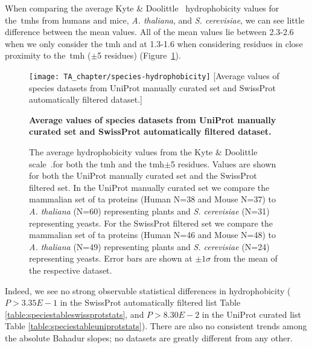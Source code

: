 When comparing the average Kyte \& Doolittle~\cite{Kyte1982} hydrophobicity values for the~\gls{tmh}s from humans and mice, \textit{A. thaliana}, and  \textit{S. cerevisiae}, we can see little difference between the mean values.
All of the mean values lie between 2.3-2.6 when we only consider the \gls{tmh} and at 1.3-1.6 when considering residues in close proximity to the~\gls{tmh} ($\pm$5 residues) (Figure~\ref{fig:average_species_hydrophobicity_ta}).

\begin{figure}[!ht]
\centering
\texttt{[image: TA\_chapter/species-hydrophobicity]}
[Average values of species datasets from UniProt manually curated set and SwissProt automatically filtered dataset.]
{\textbf{Average values of species datasets from UniProt manually curated set and SwissProt automatically filtered dataset.}

The average hydrophobicity values from the Kyte \& Doolittle scale~\cite{Kyte1982}.for both the \gls{tmh} and the \gls{tmh}$\pm$5 residues.
Values are shown for both the UniProt manually curated set and the SwissProt filtered set. In the UniProt manually curated set we compare the mammalian set of \gls{ta} proteins (Human N=38 and Mouse N=37) to \textit{A. thaliana} (N=60) representing plants and \textit{S. cerevisiae} (N=31) representing yeasts. For the SwissProt filtered set we compare the mammalian set of \gls{ta} proteins (Human N=46 and Mouse N=48) to \textit{A. thaliana} (N=49) representing plants  and  \textit{S. cerevisiae} (N=24) representing yeasts.
Error bars are shown at $\pm 1 \sigma$ from the mean of the respective dataset.
}

\label{fig:average_species_hydrophobicity_ta}
\end{figure}

Indeed, we see no strong observable statistical differences in hydrophobicity ($P>3.35E-1$ in the SwissProt automatically filtered list Table \ref{table:speciestableswissprotstats}, and $P>8.30E-2$ in the UniProt curated list Table \ref{table:speciestableuniprotstats}).
There are also no consistent trends among the absolute Bahadur slopes; no datasets are greatly different from any other.

